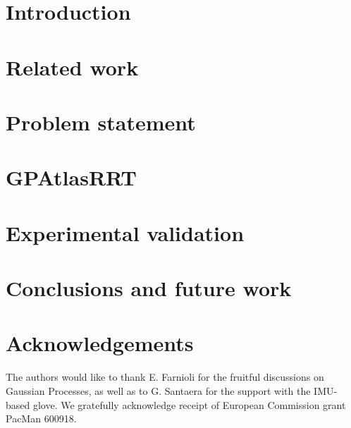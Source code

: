 \documentclass{ws-ijhr}
\begin{document}
\section{Introduction}
\label{sec:intro}



\section{Related work}
\label{sec:related}



\section{Problem statement}
\label{sec:scope}



\section{GPAtlasRRT}
\label{sec:solution}



\section{Experimental validation}
\label{sec:experiments}



\section{Conclusions and future work}
\label{sec:conclusions}



\section*{Acknowledgements}
The authors would like to thank E. Farnioli for the fruitful discussions on Gaussian Processes, as well as to G. Santaera for the support with the IMU-based glove. We gratefully acknowledge receipt of European Commission grant PacMan 600918.
\end{document}
